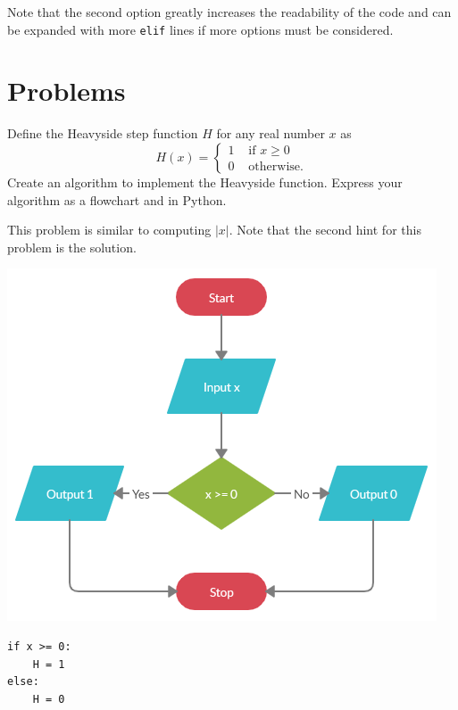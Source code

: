 \documentclass{ximera}
\begin{document}
Note that the second option greatly increases the readability of the code and can be expanded with more \verb|elif| lines if more options must be considered.

\section{Problems}

\begin{question}
Define the Heavyside step function $H$ for any real number $x$ as
	$$H(x)=\begin{cases} 1 &\text{ if $x\geq 0$}\\
		0 &\text{ otherwise.}
	\end{cases}$$
Create an algorithm to implement the Heavyside function. Express your algorithm as a flowchart and in Python.
	\begin{hint}
		This problem is similar to computing $|x|$. Note that the second hint for this problem is the solution.
	\end{hint}
	\begin{hint}
	\begin{center}
		\includegraphics{heavy.png}
	\end{center}
\begin{verbatim}
if x >= 0:
	H = 1
else:
	H = 0
\end{verbatim}
	\end{hint}
\end{question}
\end{document}
